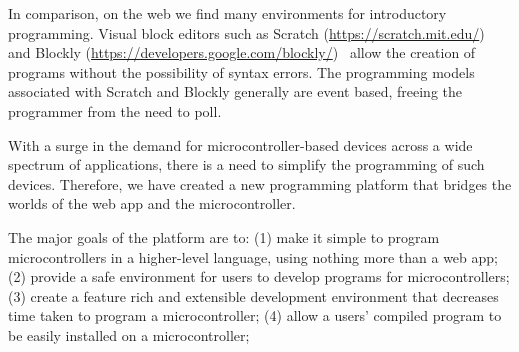 
In comparison, on the web we find many environments for introductory programming.
Visual block editors such as Scratch (\url{https://scratch.mit.edu/})~\cite{ScratchCACM2009,BlocksBeyondCACM2017}
and Blockly (\url{https://developers.google.com/blockly/})~\cite{Blocky2015}
allow the creation of programs without the possibility of syntax errors.
The programming models associated with Scratch and Blockly generally are
event based, freeing the programmer from the need to poll.


With a surge in the demand for microcontroller-based devices across a wide
spectrum of applications, 
there is a need to simplify the programming of such devices.
Therefore, we have created a new programming platform that bridges the worlds of
the web app and the microcontroller. 

The major goals of the platform are to:
(1) make it simple to program microcontrollers in a higher-level language,
using nothing more than a web app;
(2) provide a safe environment for users to develop programs for microcontrollers;
(3) create a feature rich and extensible development environment 
that decreases time taken to program a microcontroller;
(4) allow a users' compiled program to be easily installed on a microcontroller;


